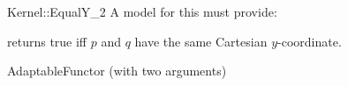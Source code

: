 \begin{ccRefFunctionObjectConcept}{Kernel::EqualY_2}
A model for this must provide:


{returns true iff $p$ and $q$ have the same Cartesian $y$-coordinate.}

\ccRefines
AdaptableFunctor (with two arguments)

\ccSeeAlso
{}\\

\end{ccRefFunctionObjectConcept}
